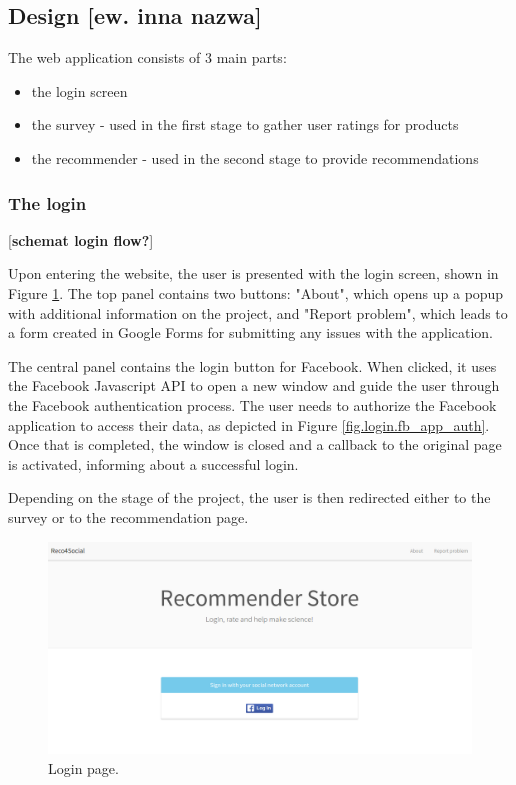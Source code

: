 \documentclass[12pt]{report}
\begin{document}
\subsection{Design [ew. inna nazwa]}

The web application consists of 3 main parts:
\begin{itemize}
\item the login screen
\item the survey - used in the first stage to gather user ratings for products
\item the recommender - used in the second stage to provide recommendations
\end{itemize}

\subsubsection{The login}
[{\bf schemat login flow?}]

Upon entering the website, the user is presented with the login screen, shown in Figure \ref{fig.login}. The top panel contains two buttons: "About", which opens up a popup with additional information on the project, and "Report problem", which leads to a form created in Google Forms for submitting any issues with the application.

The central panel contains the login button for Facebook. When clicked, it uses the Facebook Javascript API to open a new window and guide the user through the Facebook authentication process. The user needs to authorize the Facebook application to access their data, as depicted in Figure \ref{fig.login.fb_app_auth}. Once that is completed, the window is closed and a callback to the original page is activated, informing about a successful login.

Depending on the stage of the project, the user is then redirected either to the survey or to the recommendation page. 

\begin{figure}[!t]
\centering
\includegraphics[width=\textwidth]{reco4_login.png} 
\caption[Login page.]{Login page.}
\label{fig.login}
\end{figure}
\end{document}
